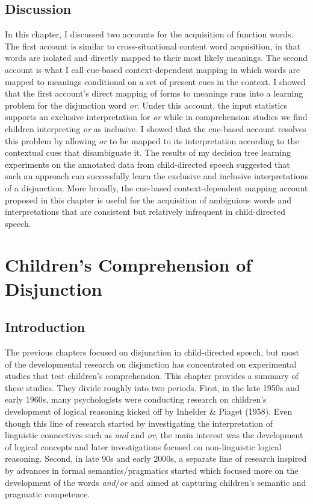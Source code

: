 \documentclass[oneside]{report}
\theoremstyle{definition}
\theoremstyle{definition}
\theoremstyle{definition}
\theoremstyle{remark}
\begin{document}
\section{Discussion}\label{discussion-2}

In this chapter, I discussed two accounts for the acquisition of
function words. The first account is similar to cross-situational
content word acquisition, in that words are isolated and directly mapped
to their most likely meanings. The second account is what I call
cue-based context-dependent mapping in which words are mapped to
meanings conditional on a set of present cues in the context. I showed
that the first account's direct mapping of forms to meanings runs into a
learning problem for the disjunction word \emph{or}. Under this account,
the input statistics supports an exclusive interpretation for \emph{or}
while in comprehension studies we find children interpreting \emph{or}
as inclusive. I showed that the cue-based account resolves this problem
by allowing \emph{or} to be mapped to its interpretation according to
the contextual cues that disambiguate it. The results of my decision
tree learning experiments on the annotated data from child-directed
speech suggested that such an approach can successfully learn the
exclusive and inclusive interpretations of a disjunction. More broadly,
the cue-based context-dependent mapping account proposed in this chapter
is useful for the acquisition of ambiguious words and interpretations
that are consistent but relatively infrequent in child-directed speech.

\chapter{Children's Comprehension of Disjunction}\label{devoLit}

\section{Introduction}\label{introduction-4}

The previous chapters focused on disjunction in child-directed speech,
but most of the developmental research on disjunction has concentrated
on experimental studies that test children's comprehension. This chapter
provides a summary of these studies. They divide roughly into two
periods. First, in the late 1950s and early 1960s, many psychologists
were conducting research on children's development of logical reasoning
kicked off by Inhelder \& Piaget (1958). Even though this line of
research started by investigating the interpretation of linguistic
connectives such as \emph{and} and \emph{or}, the main interest was the
development of logical concepts and later investigations focused on
non-linguistic logical reasoning. Second, in late 90s and early 2000s, a
separate line of research inspired by advances in formal
semantics/pragmatics started which focused more on the development of
the words \emph{and}/\emph{or} and aimed at capturing children's
semantic and pragmatic competence.
\end{document}
